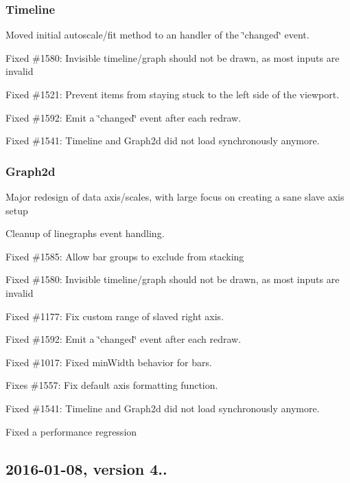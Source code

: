 \subsubsection*{Timeline}


\begin{DoxyItemize}
\item Moved initial autoscale/fit method to an handler of the \char`\"{}changed\char`\"{} event.
\item Fixed \#1580\+: Invisible timeline/graph should not be drawn, as most inputs are invalid
\item Fixed \#1521\+: Prevent items from staying stuck to the left side of the viewport.
\item Fixed \#1592\+: Emit a \char`\"{}changed\char`\"{} event after each redraw.
\item Fixed \#1541\+: Timeline and Graph2d did not load synchronously anymore.
\end{DoxyItemize}

\subsubsection*{Graph2d}


\begin{DoxyItemize}
\item Major redesign of data axis/scales, with large focus on creating a sane slave axis setup
\item Cleanup of linegraph\textquotesingle{}s event handling.
\item Fixed \#1585\+: Allow bar groups to exclude from stacking
\item Fixed \#1580\+: Invisible timeline/graph should not be drawn, as most inputs are invalid
\item Fixed \#1177\+: Fix custom range of slaved right axis.
\item Fixed \#1592\+: Emit a \char`\"{}changed\char`\"{} event after each redraw.
\item Fixed \#1017\+: Fixed min\+Width behavior for bars.
\item Fixes \#1557\+: Fix default axis formatting function.
\item Fixed \#1541\+: Timeline and Graph2d did not load synchronously anymore.
\item Fixed a performance regression
\end{DoxyItemize}

\subsection*{2016-\/01-\/08, version 4..}

